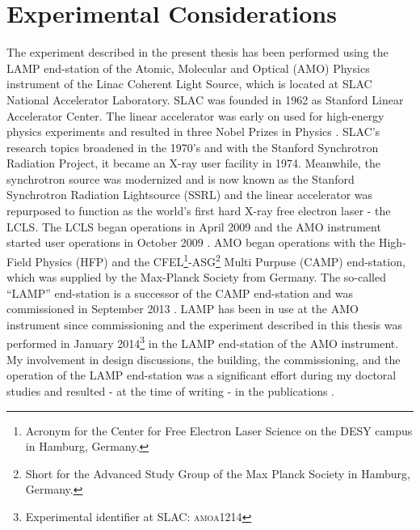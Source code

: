\chapter{Experimental Considerations}\label{ch:exp_setup}
The experiment described in the present thesis has been performed using the LAMP end-station of the Atomic, Molecular and Optical (AMO) Physics instrument of the Linac Coherent Light Source, which is located at SLAC National Accelerator Laboratory. SLAC was founded in 1962 as Stanford Linear Accelerator Center. The linear accelerator was early on used for high-energy physics experiments and resulted in three Nobel Prizes in Physics \citep{Richter-PRL-1974,Taylor-SLAC-1967,Perl-PRL-1975}. SLAC's research topics broadened in the 1970's and with the Stanford Synchrotron Radiation Project, it became an X-ray user facility in 1974. Meanwhile, the synchrotron source was modernized and is now known as the Stanford Synchrotron Radiation Lightsource (SSRL) and the linear accelerator was repurposed to function as the world's first hard X-ray free electron laser - the LCLS. The LCLS began operations in April 2009 \citep{Emma-2010-NatPho} and the AMO instrument started user operations in October 2009 \citep{Bostedt-2013-JPB}. AMO began operations with the High-Field Physics (HFP) and the CFEL\footnote{Acronym for the Center for Free Electron Laser Science on the DESY campus in Hamburg, Germany.}-ASG\footnote{Short for the Advanced Study Group of the Max Planck Society in Hamburg, Germany.} Multi Purpuse (CAMP) end-station, which was supplied by the Max-Planck Society from Germany. The so-called ``LAMP'' end-station is a successor of the CAMP end-station and was commissioned in September 2013 \citep{Ferguson-2015-JSR}. LAMP has been in use at the AMO instrument since commissioning and the experiment described in this thesis was performed in January 2014\footnote{Experimental identifier at SLAC: \textsc{amoa1214}} in the LAMP end-station of the AMO instrument. My involvement in design discussions, the building, the commissioning, and the operation of the LAMP end-station was a significant effort during my doctoral studies and resulted - at the time of writing - in the publications \citep{Picon-2016-NatComm,Munke-2016-naturedata,Kimberg-2016-FD,Sanchez-Gonzalez-2015-JphysB,Lehmann-2016-PRA,MacDonald-2016-RSI,Gamboa-2016-JI,Bernado-2017-PRB}.\\[1\baselineskip]
